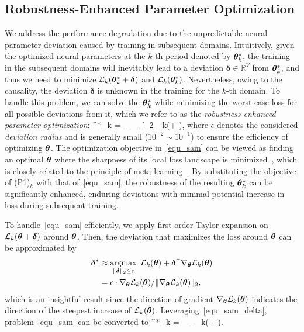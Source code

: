 \subsection{Robustness-Enhanced Parameter Optimization}\label{s2ec_robustness}
We address the performance degradation due to the unpredictable neural parameter deviation caused by training in subsequent domains.
Intuitively, given the optimized neural parameters at the $k$-th period denoted by $\bm\theta^*_k$, the training in the subsequent domains will inevitably lead to a deviation $\bm\delta\in\mathbb R^V$ from $\bm\theta^*_k$, and thus we need to minimize $\mathcal{L}_k(\bm\theta^*_k+\bm\delta)$ and $\mathcal{L}_k(\bm\theta^*_k)$.
%
Nevertheless, owing to the causality, the deviation $\bm \delta$ is unknown in the training for the $k$-th domain.
To handle this problem, we can solve the $\bm\theta^*_k$ while minimizing the worst-case loss for all possible deviations from it, which we refer to as the \emph{robustness-enhanced parameter optimization}:
\beq
\label{equ_sam}
\btheta^*_{k} = \arg\min_{\btheta} ~ \max_{\|\bdelta\|_2\leq \epsilon} \cL_{k}(\btheta + \bdelta),
\eeq
where $\epsilon$ denotes the considered \emph{deviation radius} and is generally small ($10^{-2}\!\sim\! 10^{-1}$) to ensure the efficiency of optimizing $\bm\theta$.
The optimization objective in~\eqref{equ_sam} can be viewed as finding an optimal $\bm\theta$ where the sharpness of its local loss landscape is minimized~\cite{Foret20ICLR_Sharpness}, which is closely related to the principle of meta-learning~\cite{Finn17ICML_Model}.
By substituting the objective of (P1)$_k$ with that of~\eqref{equ_sam}, the robustness of the resulting $\bm\theta^*_k$ can be significantly enhanced, enduring deviations with minimal potential increase in loss during subsequent training.

To handle~\eqref{equ_sam} efficiently, we apply first-order Taylor expansion on $\mathcal{L}_k(\bm\theta+\bm\delta)$ around $\bm\theta$.
Then, the deviation that maximizes the loss around $\bm\theta$ can be approximated by
\begin{align}
    \label{equ_sam_delta}
    \bm\delta^* & \approx \operatorname*{argmax}_{\|\bm\delta\|_2\leq \epsilon}~\mathcal{L}_k(\bm\theta) + \bm\delta^{\scriptscriptstyle\top} \nabla_{\bm\theta} \mathcal{L}_k(\bm\theta)\\
    \label{equ_sam_delta2}
    & = \epsilon \cdot \nabla_{\bm\theta} \mathcal{L}_k(\bm\theta) / \|\nabla_{\bm\theta} \mathcal{L}_k(\bm\theta)\|_2,
\end{align}
which is an insightful result since the direction of gradient $\nabla_{\bm\theta} \mathcal{L}_k(\bm\theta)$ indicates the direction of the steepest increase of $\mathcal{L}_k(\bm\theta)$.
Leveraging~\eqref{equ_sam_delta}, problem~\eqref{equ_sam} can be converted to
\beq
\label{equ_converted_prob}
\btheta^*_{k} = \arg\min_{\btheta} ~\cL_{k}\big(\btheta + \epsilon \cdot  {}\big).
\eeq

